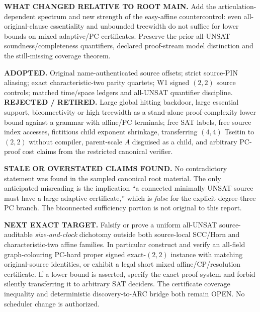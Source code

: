 \documentclass[11pt]{article}
\begin{document}
\textbf{WHAT CHANGED RELATIVE TO ROOT MAIN.} Add the articulation-dependent spectrum and new strength of the easy-affine countercontrol: even all-original-clause essentiality and unbounded treewidth do not suffice for lower bounds on mixed adaptive/PC certificates.  Preserve the prior all-UNSAT soundness/completeness quantifiers, declared proof-stream model distinction and the still-missing coverage theorem.

\textbf{ADOPTED.} Original name-authenticated source offsets; strict source-PIN aliasing; exact characteristic-two parity quartets; W1 signed $(2,2)$ source controls; matched time/space ledgers and all-UNSAT quantifier discipline. \textbf{REJECTED / RETIRED.} Large global hitting backdoor, large essential support, biconnectivity or high treewidth as a stand-alone proof-complexity lower bound against a grammar with affine/PC terminals; free SAT labels, free source index accesses, fictitious child exponent shrinkage, transferring $(4,4)$ Tseitin to $(2,2)$ without compiler, parent-scale $A$ disguised as a child, and arbitrary PC-proof cost claims from the restricted canonical verifier.

\textbf{STALE OR OVERSTATED CLAIMS FOUND.} No contradictory statement was found in the sampled canonical root material.  The only anticipated misreading is the implication ``a connected minimally UNSAT source must have a large adaptive certificate,'' which is \emph{false} for the explicit degree-three PC branch.  The biconnected sufficiency portion is not original to this report.

\textbf{NEXT EXACT TARGET.} Falsify or prove a uniform all-UNSAT source-auditable \emph{size-and-clock} dichotomy outside both source-local SCC/Horn and characteristic-two affine families.  In particular construct and verify an all-field graph-colouring PC-hard proper signed exact-$(2,2)$ instance with matching original-source identities, or exhibit a legal short mixed affine/CP/resolution certificate.  If a lower bound is asserted, specify the exact proof system and forbid silently transferring it to arbitrary SAT deciders.  The certificate coverage inequality and deterministic discovery-to-ARC bridge both remain OPEN.  No scheduler change is authorized.



\end{document}

